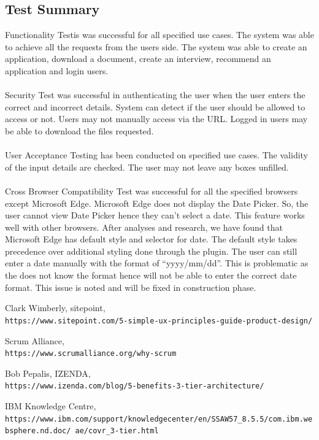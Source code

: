 \documentclass{article}
\begin{document}
\subsection{Test Summary}
Functionality Testis was successful for all specified use cases. The system was able to achieve all the requests from the users side. The system was able to create an application, download a document, create an interview, recommend an application and login users.\\ \\
Security Test was successful in authenticating the user when the user enters the correct and incorrect details. System can detect if the user should be allowed to access or not. Users may not manually access via the URL. Logged in users may be able to download the files requested. \\ \\
User Acceptance Testing has been conducted on specified use cases. The validity of the input details are checked. The user may not leave any boxes unfilled. \\ \\
Cross Browser Compatibility Test was successful for all the specified browsers except Microsoft Edge. Microsoft Edge does not display the Date Picker. So, the user cannot view Date Picker hence they can’t select a date. This feature works well with other browsers. After analyses and research, we have found that Microsoft Edge has default style and selector for date. The default style takes precedence over additional styling done through the plugin. The user can still enter a date manually with the format of “yyyy/mm/dd”. This is problematic as the does not know the format hence will not be able to enter the correct date format. This issue is noted and will be fixed in construction phase.

\begin{thebibliography}{9}
Clark Wimberly, sitepoint, \\
\texttt{https://www.sitepoint.com/5-simple-ux-principles-guide-product-design/}

Scrum Alliance, \\
\texttt{https://www.scrumalliance.org/why-scrum}

Bob Pepalis, IZENDA, \\
\texttt{https://www.izenda.com/blog/5-benefits-3-tier-architecture/}

IBM Knowledge Centre, \\
\texttt{https://www.ibm.com/support/knowledgecenter/en/SSAW57\_8.5.5/com.ibm.websphere.nd.doc/ \linebreak ae/covr\_3-tier.html}

\end{thebibliography}
\end{document}
